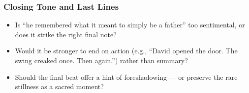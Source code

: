 \subsubsection*{Closing Tone and Last Lines}

\begin{itemize}
  \item Is ``he remembered what it meant to simply be a father'' too sentimental, or does it strike the right final note?
  \item Would it be stronger to end on action (e.g., ``David opened the door. The swing creaked once. Then again.'') rather than summary?
  \item Should the final beat offer a hint of foreshadowing — or preserve the rare stillness as a sacred moment?
\end{itemize}
